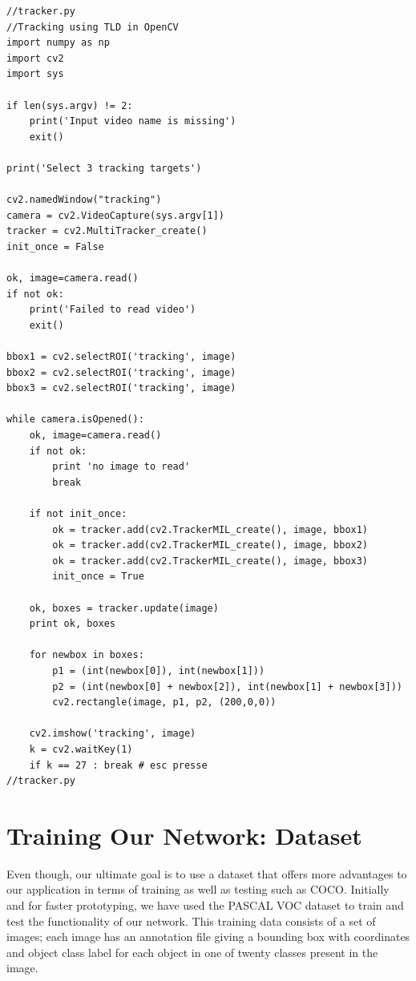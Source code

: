 \vspace{5mm}

\begin{lstlisting}
//tracker.py
//Tracking using TLD in OpenCV
import numpy as np
import cv2
import sys

if len(sys.argv) != 2:
    print('Input video name is missing')
    exit()

print('Select 3 tracking targets')

cv2.namedWindow("tracking")
camera = cv2.VideoCapture(sys.argv[1])
tracker = cv2.MultiTracker_create()
init_once = False

ok, image=camera.read()
if not ok:
    print('Failed to read video')
    exit()

bbox1 = cv2.selectROI('tracking', image)
bbox2 = cv2.selectROI('tracking', image)
bbox3 = cv2.selectROI('tracking', image)

while camera.isOpened():
    ok, image=camera.read()
    if not ok:
        print 'no image to read'
        break

    if not init_once:
        ok = tracker.add(cv2.TrackerMIL_create(), image, bbox1)
        ok = tracker.add(cv2.TrackerMIL_create(), image, bbox2)
        ok = tracker.add(cv2.TrackerMIL_create(), image, bbox3)
        init_once = True

    ok, boxes = tracker.update(image)
    print ok, boxes

    for newbox in boxes:
        p1 = (int(newbox[0]), int(newbox[1]))
        p2 = (int(newbox[0] + newbox[2]), int(newbox[1] + newbox[3]))
        cv2.rectangle(image, p1, p2, (200,0,0))

    cv2.imshow('tracking', image)
    k = cv2.waitKey(1)
    if k == 27 : break # esc presse
//tracker.py
\end{lstlisting}

\vspace{5mm}
\section{Training Our Network: Dataset}

Even though, our ultimate goal is to use a dataset that offers more advantages to our application in terms of training as well as testing such as COCO. Initially and for faster prototyping, we have used the PASCAL VOC dataset to train and test the functionality of our network. This training data consists of a set of images; each image has an annotation file giving a bounding box with coordinates and object class label for each object in one of  twenty classes present in the image.

